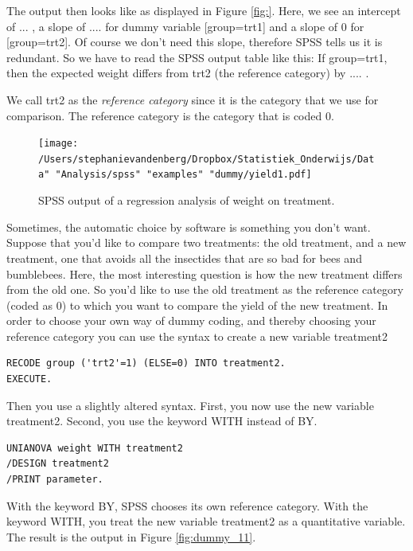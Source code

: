 \documentclass[]{report}\usepackage[]{graphicx}\usepackage[]{color}
\begin{document}
The output then looks like as displayed in Figure \ref{fig:}. Here, we see an intercept of ... , a slope of .... for dummy variable [group=trt1] and a slope of 0 for [group=trt2]. Of course we don't need this slope, therefore SPSS tells us it is redundant. So we have to read the SPSS output table like this: If group=trt1, then the expected weight differs from trt2 (the reference category) by .... . 

We call trt2 as the \textit{reference category} since it is the category that we use for comparison. The reference category is the category that is coded 0. 

\begin{figure}[h]
    \begin{center}
       \texttt{[image: /Users/stephanievandenberg/Dropbox/Statistiek\_Onderwijs/Data" "Analysis/spss" "examples" "dummy/yield1.pdf]}
    \end{center}
 \caption{SPSS output of a regression analysis of weight on treatment.}
 \label{fig:dummy_10}
\end{figure}

Sometimes, the automatic choice by software is something you don't want. Suppose that you'd like to compare two treatments: the old treatment, and a new treatment, one that avoids all the insectides that are so bad for bees and bumblebees. Here, the most interesting question is how the new treatment differs from the old one. So you'd like to use the old treatment as the reference category (coded as 0) to which you want to compare the yield of the new treatment.
In order to choose your own way of dummy coding, and thereby choosing your reference category you can use the syntax to create a new variable treatment2

\begin{verbatim}
RECODE group ('trt2'=1) (ELSE=0) INTO treatment2.
EXECUTE.
\end{verbatim}

Then you use a slightly altered syntax. First, you now use the new variable treatment2. Second, you use the keyword WITH instead of BY.

\begin{verbatim}
UNIANOVA weight WITH treatment2 
/DESIGN treatment2
/PRINT parameter.
\end{verbatim}

With the keyword BY, SPSS chooses its own reference category. With the keyword WITH, you treat the new variable treatment2 as a quantitative variable. The result is the output in Figure \ref{fig:dummy_11}.
\end{document}
